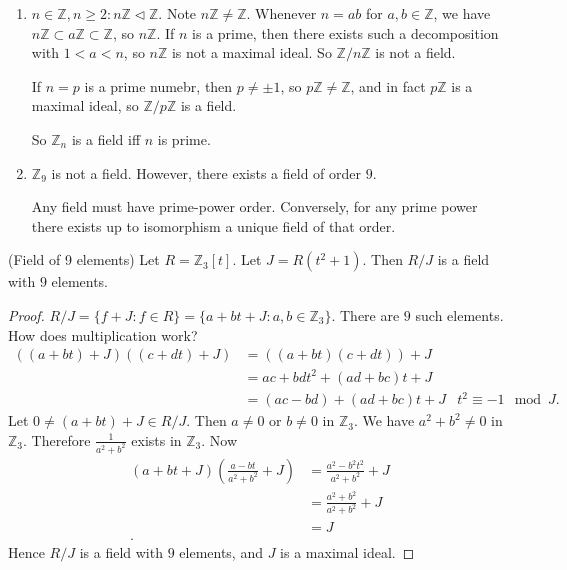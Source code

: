 \begin{example}
	\begin{enumerate}
		\item $n \in \mathbb{Z}, n \ge 2: n \mathbb{Z}\triangleleft \mathbb{Z}$. 
			Note $n \mathbb{Z}\neq \mathbb{Z}$. Whenever $n = a b$ for $a, b \in \mathbb{Z}$, we have $n \mathbb{Z} \subset a \mathbb{Z} \subset \mathbb{Z}$, so $n\mathbb{Z}$. If $n$ is a prime, then there exists such a decomposition with $1 < a < n$, so $n\mathbb{Z}$ is not a maximal ideal. So $\mathbb{Z} / n\mathbb{Z}$ is not a field.
			
			If $n = p$ is a prime numebr, then $p \neq  \pm 1$, so $p\mathbb{Z} \neq \mathbb{Z}$, and in fact $p \mathbb{Z}$ is a maximal ideal, so $\mathbb{Z} / p \mathbb{Z}$ is a field.

			So $\mathbb{Z}_n$ is a field iff $n$ is prime.
	
	\item $\mathbb{Z}_9$ is not a field. However, there exists a field of order $9$.

		\begin{fact}
			Any field must have prime-power order. Conversely, for any prime power there exists up to isomorphism a unique field of that order.
		\end{fact}
	\end{enumerate}
	\item (Field of 9 elements)
		Let $R = \mathbb{Z}_3 [t]$. Let $J = R( t^2 + 1) $. Then $R / J$ is a field with $9$ elements.
		\begin{proof}
			$R / J = \{ f + J : f \in R\} = \{a + b t + J : a, b \in \mathbb{Z}_3\} $. There are $9$ such elements.
		How does multiplication work?
		\begin{align*}
			\left( (a+bt)+J \right) \left( (c+dt)+J \right)  &= \left( (a+bt)(c+dt) \right) +J\\
			&= ac + bdt^2 + (ad+bc)t + J \\
			&= (ac -bd) + (ad+bc)t + J & t^2 \equiv -1 \mod J
		.\end{align*} 
		Let $0 \neq (a+bt) + J \in  R / J$. Then $a\neq 0$ or $b \neq 0$ in $\mathbb{Z}_3$. We have $a^2 + b^2 \neq 0$ in $\mathbb{Z}_3$. Therefore $\frac{1}{a^2 + b^2}$ exists in $\mathbb{Z}_3$. Now
		\begin{align*}
			\left( a+bt+J \right) \left( \frac{a-bt }{a^2 + b^2}+J \right) &= \frac{a^2 - b^2 t^2}{a^2 + b^2}+J \\
			&= \frac{a^2 + b^2}{a^2 + b^2} +J\\
			&= J \\
		.\end{align*} 
		Hence $R /J$ is a field with $9$ elements, and $J$ is a maximal ideal.
		\end{proof}
\end{example}
